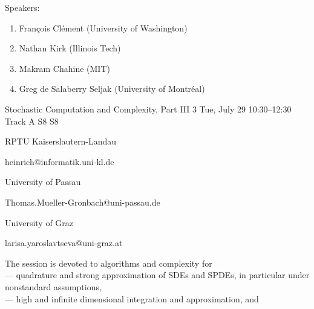 \begin{talk}
Speakers:
\begin{enumerate}
    \item François Clément (University of Washington)
    \item Nathan Kirk (Illinois Tech)
    \item Makram Chahine (MIT)
    \item Greg de Salaberry Seljak (University of Montréal)
\end{enumerate}

  
\end{talk}

\begin{talk}
  {Stochastic Computation and Complexity, Part III}%
  {3}%
  {}%
  {}%
  {}%
  {}%
  {Tue, July 29 10:30–12:30 Track A}%
  {S8}%
  {S8}%


  {%


	{RPTU Kaiserslautern-Landau}%


	{heinrich@informatik.uni-kl.de}}%


 {%


{University of Passau}%


    {Thomas.Mueller-Gronbach@uni-passau.de}}%


  {%


	{University of Graz}%


	{larisa.yaroslavtseva@uni-graz.at}}%





The session is devoted to algorithms and complexity for\\





--- quadrature and strong approximation of SDEs and SPDEs, in particular under nonstandard assumptions,\\





--- high and infinite dimensional integration and approximation, and\\






\end{talk}
